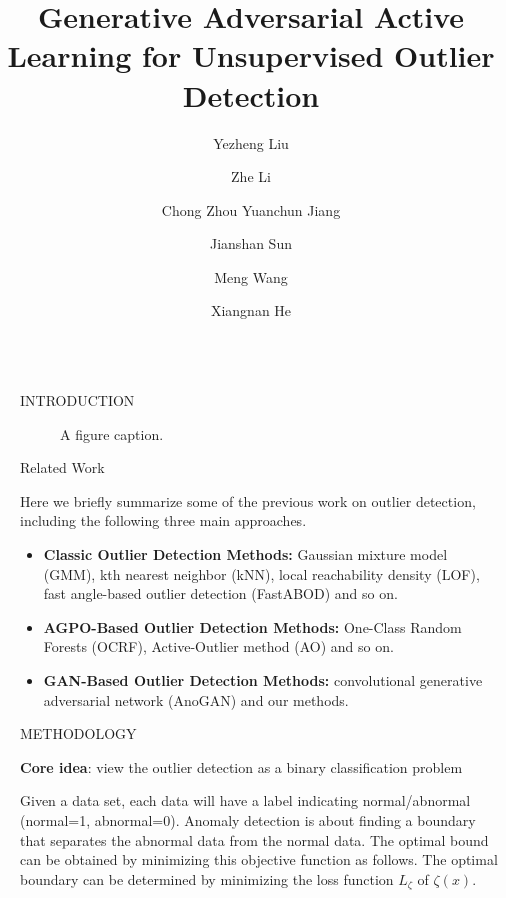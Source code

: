 \documentclass[final]{beamer}
\title{Generative Adversarial Active Learning for
	Unsupervised Outlier Detection}
\author{Yezheng Liu \inst{1} \and Zhe Li \inst{2} \and  Chong Zhou \inst{2} Yuanchun Jiang \inst{2} \and Jianshan Sun \inst{2}  \and Meng Wang \inst{2} \and Xiangnan He \inst{2} }
\institute[shortinst]{\inst{1} Some Institute \samelineand \inst{2} Another Institute}
\newlength{\sepwidth}
\newlength{\colwidth}
\newcommand{\separatorcolumn}{\begin{column}{\sepwidth}\end{column}}
\begin{document}
\begin{frame}[t]
\begin{columns}[t]
\separatorcolumn

\begin{column}{\colwidth}

  \begin{block}{INTRODUCTION}

    \begin{figure}
      \centering
      \caption{A figure caption.}
    \end{figure}

  \end{block}


  \begin{block}{Related Work}

    Here we briefly summarize some of the previous work on outlier detection, including the following three main approaches.

    \begin{itemize}
    	
      \item \textbf{Classic Outlier Detection Methods:} \justifying Gaussian mixture model (GMM), kth nearest neighbor (kNN), local reachability density (LOF), fast angle-based outlier detection (FastABOD) and so on.
      \item \textbf{AGPO-Based Outlier Detection Methods:} \justifying One-Class Random Forests (OCRF), Active-Outlier method (AO) and so on.
      \item \textbf{GAN-Based Outlier Detection Methods:}
      \justifying convolutional generative adversarial network (AnoGAN) and our methods.
      
    \end{itemize}

  \end{block}

  \begin{alertblock}{METHODOLOGY}
	
	\textbf{Core idea}: view the outlier detection as a binary classification problem
	
	Given a data set, each data will have a label indicating normal/abnormal (normal=1, abnormal=0). Anomaly detection is about finding a boundary that separates the abnormal data from the normal data. The optimal bound can be obtained by minimizing this objective function as follows. The optimal boundary can be determined by minimizing the loss function $L_{\zeta}$ of $\zeta(x)$.
	

\end{alertblock}
\end{column}
\end{columns}
\end{frame}
\end{document}
